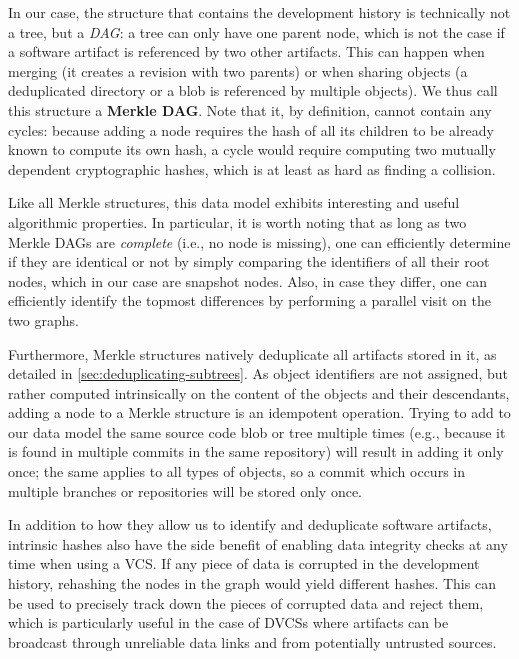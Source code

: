 In our case, the structure that contains the development history is technically
not a tree, but a \emph{\gls{DAG}}: a tree can only have one parent node, which
is not the case if a software artifact is referenced by two other artifacts.
This can happen when merging (it creates a revision with two parents) or when
sharing objects (a deduplicated directory or a blob is referenced by
multiple objects). We thus call this structure a \textbf{Merkle DAG}. Note that
it, by definition, cannot contain any cycles: because adding a node requires
the hash of all its children to be already known to compute its own hash, a
cycle would require computing two mutually dependent cryptographic hashes,
which is at least as hard as finding a collision.

Like all Merkle structures, this data model exhibits interesting and useful
algorithmic properties. In particular, it is worth noting that as long as two
Merkle DAGs are \emph{complete} (i.e., no node is missing), one can efficiently
determine if they are identical or not by simply comparing the identifiers of
all their root nodes, which in our case are snapshot nodes. Also, in case they
differ, one can efficiently identify the topmost differences by performing a
parallel visit on the two graphs.

Furthermore, Merkle structures natively deduplicate all artifacts stored in it,
as detailed in \cref{sec:deduplicating-subtrees}.  As object identifiers are
not assigned, but rather computed intrinsically on the content of the objects
and their descendants, adding a node to a Merkle structure is an idempotent
operation. Trying to add to our data model the same source code blob or tree
multiple times (e.g., because it is found in multiple commits in the same
repository) will result in adding it only once; the same applies to all types
of objects, so a commit which occurs in multiple branches or repositories
will be stored only once.

In addition to how they allow us to identify and deduplicate software
artifacts, intrinsic hashes also have the side benefit of enabling data
integrity checks at any time when using a \gls{VCS}. If any piece of data is
corrupted in the development history, rehashing the nodes in the graph would
yield different hashes. This can be used to precisely track down the pieces of
corrupted data and reject them, which is particularly useful in the case of
\glspl{DVCS} where artifacts can be broadcast through unreliable data links and
from potentially untrusted sources.


